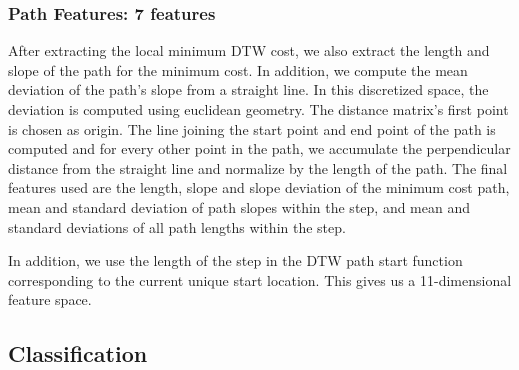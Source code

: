 \documentclass{article}
\begin{document}
\subsubsection{Path Features: 7 features}
After extracting the local minimum DTW cost, we also extract the length and slope of the path for the minimum cost. In addition, we compute the mean deviation of the path's slope from a straight line. In this discretized space, the deviation is computed using euclidean geometry. The distance matrix's first point is chosen as origin. The line joining the start point and end point of the path is computed and for every other point in the path, we accumulate the perpendicular distance from the straight line and normalize by the length of the path. The final features used are the length, slope and slope deviation of the minimum cost path, mean and standard deviation of path slopes within the step, and mean and standard deviations of all path lengths within the step.

In addition, we use the length of the step in the DTW path start function corresponding to the current unique start location. This gives us a 11-dimensional feature space.




\subsection{Classification}
\label{class}
\end{document}

